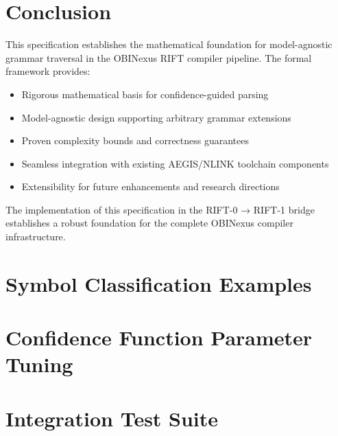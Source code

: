 \documentclass[11pt,a4paper]{article}
\theoremstyle{definition}
\theoremstyle{remark}
\begin{document}

\section{Conclusion}
\label{sec:conclusion}

This specification establishes the mathematical foundation for model-agnostic grammar traversal in the OBINexus RIFT compiler pipeline. The formal framework provides:

\begin{itemize}
\item Rigorous mathematical basis for confidence-guided parsing
\item Model-agnostic design supporting arbitrary grammar extensions  
\item Proven complexity bounds and correctness guarantees
\item Seamless integration with existing AEGIS/NLINK toolchain components
\item Extensibility for future enhancements and research directions
\end{itemize}

The implementation of this specification in the RIFT-0 → RIFT-1 bridge establishes a robust foundation for the complete OBINexus compiler infrastructure.

% 
% 

\appendix

\section{Symbol Classification Examples}
\label{app:symbol-examples}

\section{Confidence Function Parameter Tuning}
\label{app:parameter-tuning}

\section{Integration Test Suite}
\label{app:test-suite}
\end{document}
